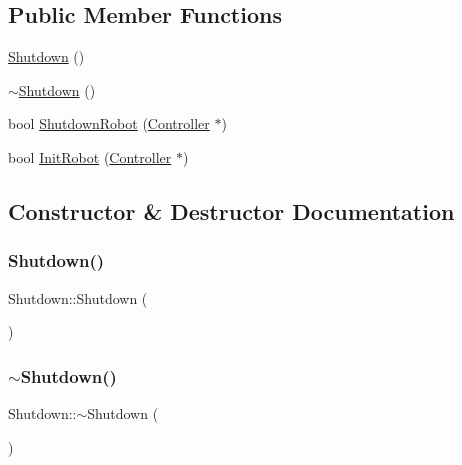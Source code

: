 \subsection*{Public Member Functions}
\begin{DoxyCompactItemize}
\item 
\mbox{\hyperlink{class_shutdown_aecc7ba075e331d286996a5da82bf5ed2}{Shutdown}} ()
\item 
\mbox{\hyperlink{class_shutdown_a968507f2814dd68fd4d97aab4e816698}{$\sim$\+Shutdown}} ()
\item 
bool \mbox{\hyperlink{class_shutdown_ac3e8449d327804a47d82f8d84c3d99b4}{Shutdown\+Robot}} (\mbox{\hyperlink{class_controller}{Controller}} $\ast$)
\item 
bool \mbox{\hyperlink{class_shutdown_a56ba69711c5d716717ce511f6ab3ec99}{Init\+Robot}} (\mbox{\hyperlink{class_controller}{Controller}} $\ast$)
\end{DoxyCompactItemize}


\subsection{Constructor \& Destructor Documentation}
\mbox{\label{class_shutdown_aecc7ba075e331d286996a5da82bf5ed2}} 
\subsubsection{\texorpdfstring{Shutdown()}{Shutdown()}}
{\footnotesize\ttfamily Shutdown\+::\+Shutdown (\begin{DoxyParamCaption}{ }\end{DoxyParamCaption})}

\mbox{\label{class_shutdown_a968507f2814dd68fd4d97aab4e816698}} 
\subsubsection{\texorpdfstring{$\sim$Shutdown()}{~Shutdown()}}
{\footnotesize\ttfamily Shutdown\+::$\sim$\+Shutdown (\begin{DoxyParamCaption}{ }\end{DoxyParamCaption})}



